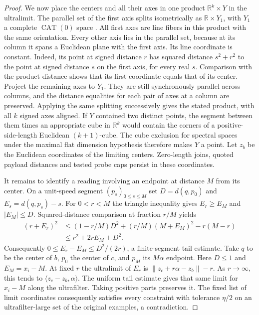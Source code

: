 \begin{proof}
We now place the centers and all their axes in one product
$\mathbb R^k\times Y$ in the ultralimit. The parallel set of the
first axis splits isometrically as $\mathbb R\times Y_1$, with $Y_1$
a complete $\operatorname{CAT}(0)$ space
\cite[Theorem~II.2.14]{BH}. All first axes are line fibers in this
product with the same orientation. Every other axis lies in the
parallel set, because at its column it spans a Euclidean plane with
the first axis. Its line coordinate is constant. Indeed, its point at signed
distance $r$ has squared distance $s^2+r^2$ to the point at signed
distance $s$ on the first axis, for every real $s$. Comparison with
the product distance shows that its first coordinate equals that of
its center. Project the remaining axes to $Y_1$. They are still
synchronously parallel across columns, and the distance equalities for
each pair of axes at a column are preserved. Applying the same
splitting successively gives the stated product, with all $k$ signed
axes aligned. If $Y$ contained two distinct points, the segment between
them times an appropriate cube in $\mathbb R^k$ would contain the
corners of a positive-side-length Euclidean $(k+1)$-cube. The cube
exclusion for spectral spaces under the maximal flat dimension hypothesis
therefore makes $Y$ a point. Let $z_b$ be the Euclidean coordinates
of the limiting centers. Zero-length joins, quoted payload distances
and tested probe caps persist in these coordinates.

It remains to identify a reading involving an endpoint at distance
$M$ from its center. On a unit-speed segment $(p_s)_{0\le s\le M}$ set
$D=d(q,p_0)$ and $E_s=d(q,p_s)-s$. For $0<r<M$ the triangle
inequality gives $E_r\ge E_M$ and $|E_M|\le D$. Squared-distance
comparison at fraction $r/M$ yields
\begin{align*}
 (r+E_r)^2
 &\le (1-r/M)D^2+(r/M)(M+E_M)^2-r(M-r)\\
 &\le r^2+2r E_M+D^2 .
\end{align*}
Consequently $0\le E_r-E_M\le D^2/(2r)$, a finite-segment tail estimate. Take $q$ to be the center of $b$,
$p_0$ the center of $c$, and $p_M$ its $M\alpha$ endpoint.
Here $D\le1$ and $E_M=x_i-M$. At fixed $r$ the ultralimit of
$E_r$ is $\|z_c+r\alpha-z_b\|-r$. As $r\to\infty$, this tends to
$\langle z_c-z_b,\alpha\rangle$. The uniform tail estimate gives that
same limit for $x_i-M$ along the ultrafilter. Taking positive parts
preserves it. The fixed list of limit coordinates consequently
satisfies every constraint with tolerance $\eta/2$ on an
ultrafilter-large set of the original examples, a contradiction.


\end{proof}

